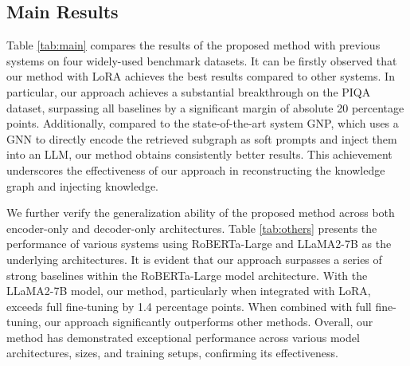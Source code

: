 \documentclass[11pt]{article}
\begin{document}
\begin{table}
\centering
{}
\caption{\label{tab:others}
Results on OBQA dataset using Encoder-only (RoBERTa-Large) and Decoder-only (LLaMA2-7B) architectures.
}
\vspace{-0.5cm}
\end{table}

\subsection{Main Results}
Table \ref{tab:main} compares the results of the proposed method with previous systems on four widely-used benchmark datasets. 
It can be firstly observed that our method with LoRA achieves the best results compared to other systems. In particular, our approach achieves a substantial breakthrough on the PIQA dataset, surpassing all baselines by a significant margin of absolute 20 percentage points.
Additionally, compared to the state-of-the-art system GNP, which uses a GNN to directly encode the retrieved subgraph as soft prompts and inject them into an LLM, our method obtains consistently better results. This achievement underscores the effectiveness of our approach in reconstructing the knowledge graph and injecting knowledge.

We further verify the generalization ability of the proposed method across both encoder-only and decoder-only architectures. 
Table \ref{tab:others} presents the performance of various systems using RoBERTa-Large and LLaMA2-7B as the underlying architectures. 
It is evident that our approach surpasses a series of strong baselines within the RoBERTa-Large model architecture. 
With the LLaMA2-7B model, our method, particularly when integrated with LoRA, exceeds full fine-tuning by 1.4 percentage points. 
When combined with full fine-tuning, our approach significantly outperforms other methods. 
Overall, our method has demonstrated exceptional performance across various model architectures, sizes, and training setups, confirming its effectiveness.
\end{document}
